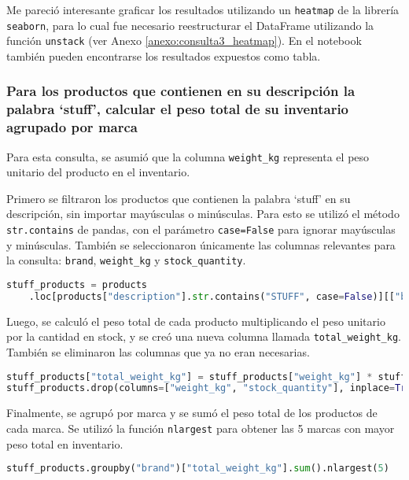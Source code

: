 Me pareció interesante graficar los resultados utilizando un \texttt{heatmap} de la librería \texttt{seaborn}, para lo cual fue necesario reestructurar el DataFrame utilizando la función \texttt{unstack} (ver Anexo \ref{anexo:consulta3_heatmap}). En el notebook también pueden encontrarse los resultados expuestos como tabla.

\subsubsection{Para los productos que contienen en su descripción la palabra `stuff', calcular el peso total de su inventario agrupado por marca}

Para esta consulta, se asumió que la columna \texttt{weight\_kg} representa el peso unitario del producto en el inventario.

Primero se filtraron los productos que contienen la palabra `stuff' en su descripción, sin importar mayúsculas o minúsculas. Para esto se utilizó el método \texttt{str.contains} de pandas, con el parámetro \texttt{case=False} para ignorar mayúsculas y minúsculas. También se seleccionaron únicamente las columnas relevantes para la consulta: \texttt{brand}, \texttt{weight\_kg} y \texttt{stock\_quantity}.

\begin{lstlisting}[language=Python, xleftmargin=0pt, xrightmargin=0pt]
stuff_products = products
    .loc[products["description"].str.contains("STUFF", case=False)][["brand", "weight_kg", "stock_quantity"]]
\end{lstlisting}

Luego, se calculó el peso total de cada producto multiplicando el peso unitario por la cantidad en stock, y se creó una nueva columna llamada \texttt{total\_weight\_kg}. También se eliminaron las columnas que ya no eran necesarias.

\begin{lstlisting}[language=Python, xleftmargin=25pt, xrightmargin=25pt]
stuff_products["total_weight_kg"] = stuff_products["weight_kg"] * stuff_products["stock_quantity"]
stuff_products.drop(columns=["weight_kg", "stock_quantity"], inplace=True)
\end{lstlisting}

Finalmente, se agrupó por marca y se sumó el peso total de los productos de cada marca. Se utilizó la función \texttt{nlargest} para obtener las 5 marcas con mayor peso total en inventario.

\begin{lstlisting}[language=Python, xleftmargin=75pt, xrightmargin=75pt]
    stuff_products.groupby("brand")["total_weight_kg"].sum().nlargest(5)
\end{lstlisting}

